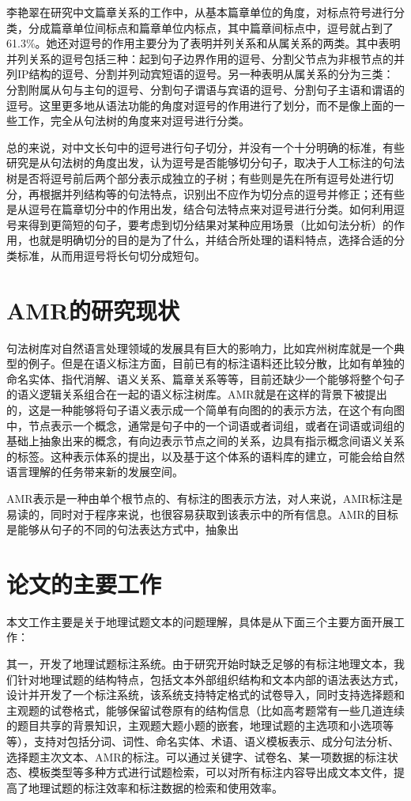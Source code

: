 \documentclass[master, winfont]{njuthesis}
\begin{document}
李艳翠\cite{liyancui2015}在研究中文篇章关系的工作中，从基本篇章单位的角度，对标点符号进行分类，分成篇章单位间标点和篇章单位内标点，其中篇章间标点中，逗号就占到了61.3\%。她还对逗号的作用主要分为了表明并列关系和从属关系的两类。其中表明并列关系的逗号包括三种：起到句子边界作用的逗号、分割父节点为非根节点的并列IP结构的逗号、分割并列动宾短语的逗号。另一种表明从属关系的分为三类：分割附属从句与主句的逗号、分割句子谓语与宾语的逗号、分割句子主语和谓语的逗号。这里更多地从语法功能的角度对逗号的作用进行了划分，而不是像上面的一些工作，完全从句法树的角度来对逗号进行分类。

总的来说，对中文长句中的逗号进行句子切分，并没有一个十分明确的标准，有些研究是从句法树的角度出发，认为逗号是否能够切分句子，取决于人工标注的句法树是否将逗号前后两个部分表示成独立的子树；有些则是先在所有逗号处进行切分，再根据并列结构等的句法特点，识别出不应作为切分点的逗号并修正；还有些是从逗号在篇章切分中的作用出发，结合句法特点来对逗号进行分类。如何利用逗号来得到更简短的句子，要考虑到切分结果对某种应用场景（比如句法分析）的作用，也就是明确切分的目的是为了什么，并结合所处理的语料特点，选择合适的分类标准，从而用逗号将长句切分成短句。

\section{AMR的研究现状}
句法树库对自然语言处理领域的发展具有巨大的影响力，比如宾州树库就是一个典型的例子。但是在语义标注方面，目前已有的标注语料还比较分散，比如有单独的命名实体、指代消解、语义关系、篇章关系等等，目前还缺少一个能够将整个句子的语义逻辑关系组合在一起的语义标注树库。AMR就是在这样的背景下被提出的，这是一种能够将句子语义表示成一个简单有向图的的表示方法，在这个有向图中，节点表示一个概念，通常是句子中的一个词语或者词组，或者在词语或词组的基础上抽象出来的概念，有向边表示节点之间的关系，边具有指示概念间语义关系的标签。这种表示体系的提出，以及基于这个体系的语料库的建立，可能会给自然语言理解的任务带来新的发展空间。

AMR表示是一种由单个根节点的、有标注的图表示方法\cite{Banarescu2013Abstract}，对人来说，AMR标注是易读的，同时对于程序来说，也很容易获取到该表示中的所有信息。AMR的目标是能够从句子的不同的句法表达方式中，抽象出


\section{论文的主要工作}
本文工作主要是关于地理试题文本的问题理解，具体是从下面三个主要方面开展工作：

其一，开发了地理试题标注系统。由于研究开始时缺乏足够的有标注地理文本，我们针对地理试题的结构特点，包括文本外部组织结构和文本内部的语法表达方式，设计并开发了一个标注系统，该系统支持特定格式的试卷导入，同时支持选择题和主观题的试卷格式，能够保留试卷原有的结构信息（比如高考题常有一些几道连续的题目共享的背景知识，主观题大题小题的嵌套，地理试题的主选项和小选项等等），支持对包括分词、词性、命名实体、术语、语义模板表示、成分句法分析、选择题主次文本、AMR的标注。可以通过关键字、试卷名、某一项数据的标注状态、模板类型等多种方式进行试题检索，可以对所有标注内容导出成文本文件，提高了地理试题的标注效率和标注数据的检索和使用效率。
\end{document}
